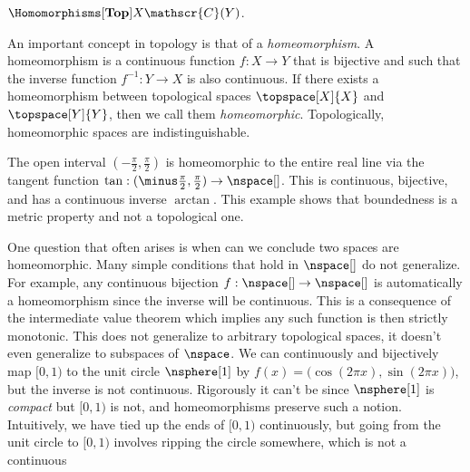 \documentclass{book}                                                           %
\begin{document}
                $\Homomorphisms[\textbf{Top}]{X}{\mathscr{C}(Y)}$.
                \par\hfill\par
                An important concept in topology is that of a
                \textit{homeomorphism}. A homeomorphism is a continuous function
                $f:X\rightarrow{Y}$ that is bijective and such that the inverse
                function $f^{\minus{1}}:Y\rightarrow{X}$ is also continuous.
                If there exists a homeomorphism between topological spaces
                $\topspace[X]{X}$ and $\topspace[Y]{Y}$, then we call them
                \textit{homeomorphic}. Topologically, homeomorphic spaces are
                indistinguishable.
                \begin{example}
                    The open interval $(\minus\frac{\pi}{2},\frac{\pi}{2})$ is
                    homeomorphic to the entire real line via the tangent
                    function $\tan:(\minus\frac{\pi}{2},\frac{\pi}{2})%
                    \rightarrow\nspace[]$. This is continuous, bijective, and
                    has a continuous inverse $\arctan$. This example shows that
                    boundedness is a metric property and not a topological one.
                \end{example}
                One question that often arises is when can we conclude two
                spaces are homeomorphic. Many simple conditions that hold in
                $\nspace[]$ do not generalize. For example, any continuous
                bijection $f:\nspace[]\rightarrow\nspace[]$ is automatically a
                homeomorphism since the inverse will be continuous. This is a
                consequence of the intermediate value theorem which implies any
                such function is then strictly monotonic. This does not
                generalize to arbitrary topological spaces, it doesn't even
                generalize to subspaces of $\nspace$. We can continuously and
                bijectively map $[0,1)$ to the unit circle $\nsphere[1]$ by
                $f(x)=\big(\cos(2\pi{x}),\sin(2\pi{x})\big)$, but the inverse is
                not continuous. Rigorously it can't be since $\nsphere[1]$ is
                \textit{compact} but $[0,1)$ is not, and homeomorphisms preserve
                such a notion. Intuitively, we have tied up the ends of $[0,1)$
                continuously, but going from the unit circle to $[0,1)$ involves
                ripping the circle somewhere, which is not a continuous
\end{document}
